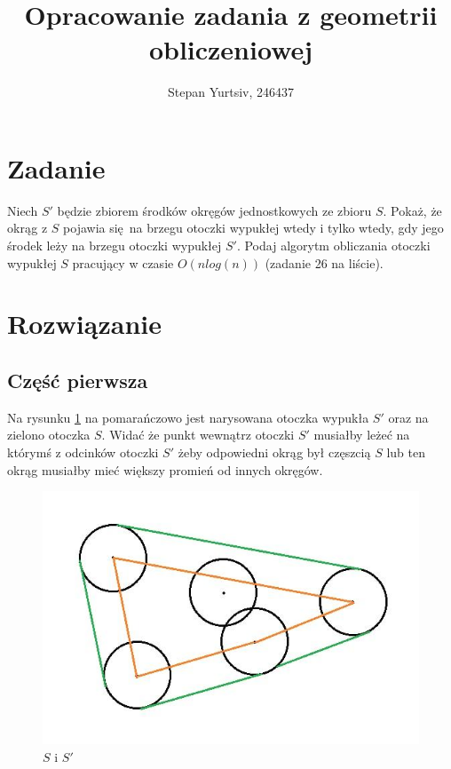 \documentclass[12pt, a4paper]{article}
\title{Opracowanie zadania z geometrii obliczeniowej}
\author{Stepan Yurtsiv, 246437}
\begin{document}
\maketitle

\section*{Zadanie}

Niech $S'$ będzie zbiorem środków okręgów jednostkowych ze zbioru $S$. Pokaż, że okrąg z $S$ pojawia się na brzegu otoczki wypukłej wtedy i tylko wtedy, gdy jego środek
leży na brzegu otoczki wypukłej $S'$. Podaj algorytm obliczania otoczki wypukłej $S$ pracujący w czasie $O(nlog(n))$ (zadanie 26 na liście).


\section*{Rozwiązanie}

\subsection*{Część pierwsza}

Na rysunku \ref{fig:img1} na pomarańczowo jest narysowana otoczka wypukła $S'$ oraz na zielono otoczka $S$. 
Widać że punkt wewnątrz otoczki $S'$ musiałby leżeć na którymś z odcinków otoczki $S'$ żeby odpowiedni okrąg był
częszcią $S$ lub ten okrąg musiałby mieć większy promień od innych okręgów.

\begin{figure}[H]
  \begin{center}
  \includegraphics[scale=0.65]{Img1}
  \caption{$S$ i $S'$}
  \label{fig:img1}
  \end{center}
\end{figure}
\end{document}
